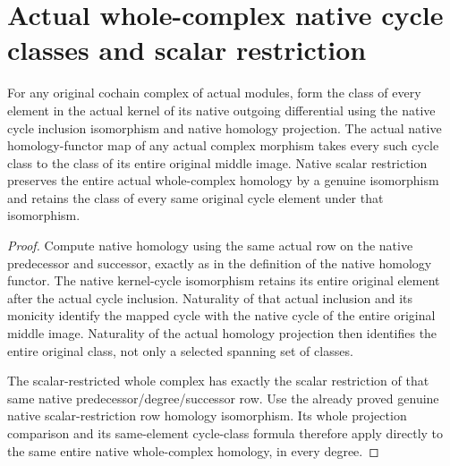 \section{Actual whole-complex native cycle classes and scalar restriction}
\label{sec:module-complex-native-cycle-classes}

\begin{theorem}
\label{lem:native-module-complex-every-cycle-class}
\leanok
For any original cochain complex of actual modules, form the class
of every element in the actual kernel of its native outgoing
differential using the native cycle inclusion isomorphism and native
homology projection. The actual native homology-functor map of any
actual complex morphism takes every such cycle class to the class
of its entire original middle image. Native scalar restriction
preserves the entire actual whole-complex homology by a genuine
isomorphism and retains the class of every same original cycle
element under that isomorphism.
\end{theorem}
\begin{proof}
Compute native homology using the same actual row on the native
predecessor and successor, exactly as in the definition of the native
homology functor. The native kernel-cycle isomorphism retains its
entire original element after the actual cycle inclusion. Naturality
of that actual inclusion and its monicity identify the mapped cycle
with the native cycle of the entire original middle image.
Naturality of the actual homology projection then identifies the
entire original class, not only a selected spanning set of classes.

The scalar-restricted whole complex has exactly the scalar
restriction of that same native predecessor/degree/successor row.
Use the already proved genuine native scalar-restriction row
homology isomorphism. Its whole projection comparison and its
same-element cycle-class formula therefore apply directly to the
same entire native whole-complex homology, in every degree.
\end{proof}

